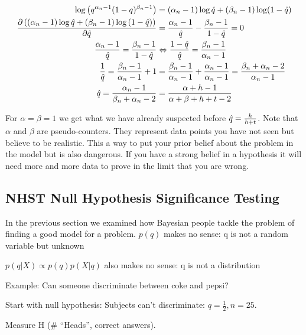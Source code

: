 \begin{align*}
\log{\left(q^{\alpha_n-1}(1-q)^{\beta_n-1}\right)} &= (\alpha_n-1)\log \est{q} + (\beta_n-1)\log (1-\est{q}) \\
\frac{\partial \left(\left(\alpha_n-1\right)\log \est{q} + \left(\beta_n-1\right)\log \left(1-\est{q}\right)\right)}{\partial \est{q}} &= \frac{\alpha_n-1}{\est{q}} - \frac{\beta_n-1}{1-\est{q}} = 0 \\
\frac{\alpha_n-1}{\est{q}} = \frac{\beta_n-1}{1-\est{q}} &\Leftrightarrow \frac{1-\est{q}}{\est{q}} = \frac{\beta_n-1}{\alpha_n-1} \\
\frac{1}{\est{q}} = \frac{\beta_n-1}{\alpha_n-1}+1 &= \frac{\beta_n-1}{\alpha_n-1} + \frac{\alpha_n-1}{\alpha_n-1} = \frac{\beta_n+\alpha_n-2}{\alpha_n-1} \\
\est{q} = \frac{\alpha_n-1}{\beta_n+\alpha_n-2} &= \frac{\alpha+h-1}{\alpha+\beta+h+t-2}
\end{align*}


For $\alpha = \beta =1$ we get what we have already suspected before $\est{q}=\frac{h}{h+t}$. Note that $\alpha$ and $\beta$ are pseudo-counters. They represent data points you have not seen but believe to be realistic. This a way to put your prior belief about the problem in the model but is also dangerous. If you have a strong belief in a hypothesis it will need more and more data to prove in the limit that you are wrong.

\subsection[Null Hypothesis Significance Testing (NHST)]{NHST Null Hypothesis Significance Testing}
In the previous section we examined how Bayesian people tackle the problem of finding a good model for a problem.
$p(q)$ makes no sense: q is not a random variable but unknown

$p(q|X) \propto p(q)p(X|q)$ also makes no sense: q is not a distribution

Example: Can someone discriminate between coke and pepsi?

Start with null hypothesis: Subjects can't discriminate: $q = \frac{1}{2}, n = 25$.

Measure H (\# ``Heads'', correct answers).

